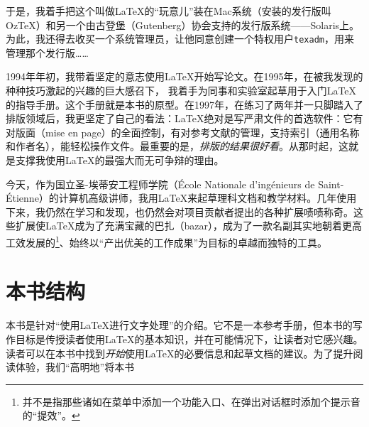 于是，我着手把这个叫做\LaTeX 的“玩意儿”装在Mac系统（安装的发行版叫Oz\TeX ）和另一个由古登堡（Gutenberg）协会支持的发行版系统——Solaris上。为此，我还得去收买一个系统管理员，让他同意创建一个特权用户\texttt{texadm}，用来管理那个发行版……

1994年年初，我带着坚定的意志使用\LaTeX 开始写论文。在1995年，在被我发现的种种技巧激起的兴趣的巨大感召下，%
我着手为同事和实验室起草用于入门\LaTeX 的指导手册。这个手册就是本书的原型。在1997年，在练习了两年并一只脚踏入了排版领域后，我更坚定了自己的看法：\LaTeX 绝对是写严肃文件的首选软件：它有对版面（mise en page）的全面控制，有对参考文献的管理，支持索引（通用名称和作者名），能轻松操作文件。最重要的是，\textit{排版的结果很好看}。从那时起，这就是支撑我使用\LaTeX 的最强大而无可争辩的理由。

今天，作为国立圣-埃蒂安工程师学院（École Nationale d’ingénieurs de Saint-Étienne）的计算机高级讲师，我用\LaTeX 来起草理科文档和教学材料。几年使用下来，我仍然在学习和发现，也仍然会对项目贡献者提出的各种扩展啧啧称奇。这些扩展使\LaTeX 成为了充满宝藏的巴扎（bazar），成为了一款名副其实地朝着更高工效发展的\footnote{
    并不是指那些诸如在菜单中添加一个功能入口、在弹出对话框时添加个提示音的“提效”。
}、始终以“产出优美的工作成果”为目标的卓越而独特的工具。

\section*{本书结构}

本书是针对“使用\LaTeX 进行文字处理”的介绍。它不是一本参考手册，但本书的写作目标是传授读者使用\LaTeX 的基本知识，并在可能情况下，让读者对它感兴趣。读者可以在本书中找到\textit{开始}使用\LaTeX 的必要信息和起草文档的建议。为了提升阅读体验，我们“高明地”将本书